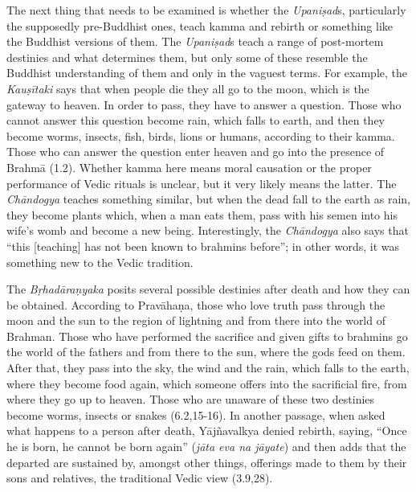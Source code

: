 The next thing that needs to be examined is whether the
\emph{Upaniṣad}s, particularly the supposedly pre-Buddhist ones, teach
kamma and rebirth or something like the Buddhist versions of them. The
\emph{Upaniṣad}s teach a range of post-mortem destinies and what
determines them, but only some of these resemble the Buddhist
understanding of them and only in the vaguest terms. For example, the
\emph{Kauṣītaki} says that when people die they all go to the moon,
which is the gateway to heaven. In order to pass, they have to answer a
question. Those who cannot answer this question become rain, which falls
to earth, and then they become worms, insects, fish, birds, lions or
humans, according to their kamma. Those who can answer the question
enter heaven and go into the presence of Brahmā (1.2). Whether kamma
here means moral causation or the proper performance of Vedic rituals is
unclear, but it very likely means the latter. The \emph{Chāndogya}
teaches something similar, but when the dead fall to the earth as rain,
they become plants which, when a man eats them, pass with his semen into
his wife's womb and become a new being. Interestingly, the
\emph{Chāndogya} also says that ``this {[}teaching{]} has not been known
to brahmins before''; in other words, it was something new to the Vedic
tradition.

The \emph{Bṛhadāraṇyaka} posits several possible destinies after death
and how they can be obtained. According to Pravāhaṇa, those who love
truth pass through the moon and the sun to the region of lightning and
from there into the world of Brahman. Those who have performed the
sacrifice and given gifts to brahmins go the world of the fathers and
from there to the sun, where the gods feed on them. After that, they
pass into the sky, the wind and the rain, which falls to the earth,
where they become food again, which someone offers into the sacrificial
fire, from where they go up to heaven. Those who are unaware of these
two destinies become worms, insects or snakes (6.2,15-16). In another
passage, when asked what happens to a person after death, Yājñavalkya
denied rebirth, saying, ``Once he is born, he cannot be born again''
(\emph{jāta eva na jāyate}) and then adds that the departed are
sustained by, amongst other things, offerings made to them by their sons
and relatives, the traditional Vedic view (3.9,28).

